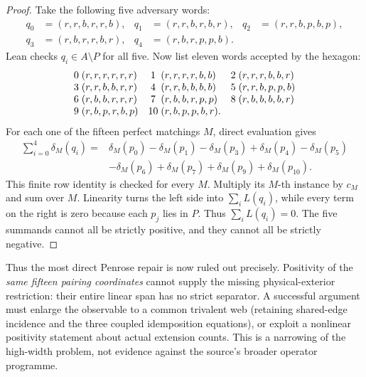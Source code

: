 \begin{proof}
Take the following five adversary words:
\[
\begin{aligned}
q_0&=(r,r,b,r,r,b),&q_1&=(r,r,b,r,b,r),&
q_2&=(r,r,b,p,b,p),\\
q_3&=(r,b,r,r,b,r),&q_4&=(r,b,r,p,p,b).
\end{aligned}
\]
Lean checks \(q_i\in A\setminus P\) for all five.
Now list eleven words accepted by the hexagon:
\[
\begin{array}{c@{\;}l c@{\;}l c@{\;}l}
0&(r,r,r,r,r,r)&1&(r,r,r,r,b,b)&2&(r,r,r,b,b,r)\\
3&(r,r,b,b,r,r)&4&(r,r,b,b,b,b)&5&(r,r,b,p,p,b)\\
6&(r,b,b,r,r,r)&7&(r,b,b,r,p,p)&8&(r,b,b,b,b,r)\\
9&(r,b,p,r,b,p)&10&(r,b,p,p,b,r).&&
\end{array}
\]
For each one of the fifteen perfect matchings \(M\), direct evaluation gives
\[
\begin{split}
\sum_{i=0}^{4}\delta_M(q_i)
={}&\delta_M(p_0)-\delta_M(p_1)-\delta_M(p_3)+\delta_M(p_4)
     -\delta_M(p_5)\\
 &-\delta_M(p_6)+\delta_M(p_7)+\delta_M(p_9)+\delta_M(p_{10}).
\end{split}
\]
This finite row identity is checked for every \(M\).
Multiply its \(M\)-th instance by \(c_M\) and sum over \(M\).  Linearity
turns the left side into \(\sum_iL(q_i)\), while every term on the right is
zero because each \(p_j\) lies in \(P\).  Thus
\(\sum_iL(q_i)=0\).  The five summands cannot all be strictly positive, and
they cannot all be strictly negative.
\end{proof}

Thus the most direct Penrose repair is now ruled out precisely.  Positivity
of the \emph{same fifteen pairing coordinates} cannot supply the missing
physical-exterior restriction: their entire linear span has no strict
separator.  A successful argument must enlarge the observable to a common
trivalent web (retaining shared-edge incidence and the three coupled
idemposition equations), or exploit a nonlinear positivity statement about
actual extension counts.  This is a narrowing of the high-width problem,
not evidence against the source's broader operator programme.

